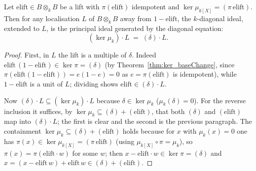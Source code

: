 \begin{theorem}
  \label{thm:ker_map_localization_eq}
  \leanok
  Let \(\mathrm{elift} \in B \otimes_k B\) be a lift with \(\pi(\mathrm{elift})\) idempotent and
  \(\ker \mu_{k[X]} = (\pi\,\mathrm{elift})\). Then for any localisation \(L\) of \(B \otimes_k B\)
  away from \(1 - \mathrm{elift}\), the \(k\)-diagonal ideal, extended to \(L\), is the principal
  ideal generated by the diagonal equation:
  \[
    (\ker \mu_k)\cdot L \;=\; (\delta)\cdot L .
  \]
\end{theorem}
\begin{proof}
  \leanok
  First, in \(L\) the lift is a multiple of \(\delta\). Indeed \(\mathrm{elift}\,(1 -
  \mathrm{elift}) \in \ker \pi = (\delta)\) (by Theorem~\ref{thm:ker_baseChange}, since
  \(\pi(\mathrm{elift}(1-\mathrm{elift})) = e(1-e) = 0\) as \(e = \pi(\mathrm{elift})\) is
  idempotent), while \(1 - \mathrm{elift}\) is a unit of \(L\); dividing shows \(\mathrm{elift} \in
  (\delta)\cdot L\).

  Now \((\delta)\cdot L \subseteq (\ker \mu_k)\cdot L\) because \(\delta \in \ker \mu_k\)
  (\(\mu_k(\delta) = 0\)). For the reverse inclusion it suffices, by \(\ker \mu_k \subseteq
  (\delta) + (\mathrm{elift})\), that both \((\delta)\) and \((\mathrm{elift})\) map into
  \((\delta)\cdot L\); the first is clear and the second is the previous paragraph. The
  containment \(\ker \mu_k \subseteq (\delta) + (\mathrm{elift})\) holds because for \(x\) with
  \(\mu_k(x) = 0\) one has \(\pi(x) \in \ker \mu_{k[X]} = (\pi\,\mathrm{elift})\) (using
  \(\mu_{k[X]} \circ \pi = \mu_k\)), so \(\pi(x) = \pi(\mathrm{elift}\cdot w)\) for some \(w\);
  then \(x - \mathrm{elift}\cdot w \in \ker \pi = (\delta)\) and \(x = (x - \mathrm{elift}\,w) +
  \mathrm{elift}\,w \in (\delta) + (\mathrm{elift})\).
\end{proof}

